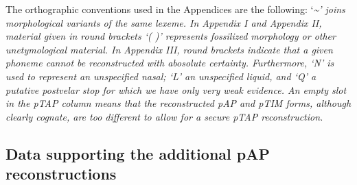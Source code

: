 \addtocounter{footnote}{-2}
The orthographic conventions used in the Appendices are the following: `\emph{\textup{\~{}' joins morphological variants of the same lexeme. In Appendix I and Appendix II, material given in round brackets `( )' represents fossilized morphology or other unetymological material. In Appendix III, round brackets indicate that a given phoneme cannot be reconstructed with abosolute certainty. Furthermore, `N' is used to represent an unspecified nasal; `L' an unspecified liquid, and `Q' a putative postvelar stop for which we have only very weak evidence. An empty slot in the pTAP column means that the reconstructed pAP and pTIM forms, although clearly cognate, are too different to allow for a secure pTAP reconstruction.} }


\startappendix
\subsection{Data supporting the additional pAP reconstructions}
 



